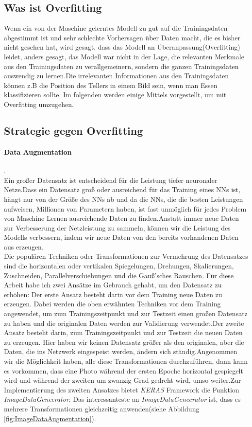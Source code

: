\documentclass[12pt,a4paper]{scrartcl}
\numberwithin{equation}{section}
\begin{document}
 \subsection{Was ist Overfitting}
 Wenn ein von der Maschine gelerntes Modell zu gut auf die Trainingsdaten abgestimmt ist und sehr schlechte Vorhersagen über Daten macht, die es bisher nicht gesehen hat, wird gesagt, dass das Modell an Überanpassung(Overfitting) leidet, anders gesagt, das Modell war nicht in der Lage, die relevanten Merkmale aus den Trainingsdaten zu verallgemeinern, sondern die ganzen Trainingsdaten auswendig zu lernen.Die irrelevanten Informationen aus den Trainingsdaten können z.B die Position des Tellers in einem Bild sein, wenn man Essen klassifizieren sollte. Im folgenden werden einige Mittels vorgestellt, um mit Overfitting umzugehen.
 \subsection{Strategie gegen Overfitting}
 \paragraph{Data Augmentation}.\\
 Ein großer Datensatz ist entscheidend für die Leistung tiefer neuronaler Netze.Dass ein Datensatz groß oder ausreichend für das Training eines \ac{NN}s ist, hängt nur von der Größe des \ac{NN}s ab und da die \acsp{NN}, die die besten Leistungen aufweisen, Millionen von Parametern haben, ist fast unmöglich für jedes  Problem von Maschine Lernen ausreichende Daten zu finden.Anstatt immer neue Daten zur Verbesserung der Netzleistung zu sammeln, können wir die Leistung des Modells verbessern, indem wir neue Daten von den bereits vorhandenen Daten aus erzeugen.\\
 Die populären Techniken oder Transformationen zur Vermehrung des Datensatzes sind die horizontalen oder vertikalen Spiegelungen, Drehungen, Skalierungen, Zuschneiden, Parallelverschiebungen und die Gauß'sches Rauschen.
 Für diese Arbeit habe ich zwei Ansätze im Gebrauch gehabt, um den Datensatz zu erhöhen:
 Der erste Ansatz besteht darin vor dem Training neue Daten zu erzeugen. Dabei werden die oben erwähnten Techniken vor dem Training angewendet, um zum Trainingszeitpunkt und zur Testzeit einen großen Datensatz zu haben und die originalen Daten werden zur Validierung verwendet.Der zweite Ansatz besteht darin, zum Trainingszeitpunkt und zur Testzeit die neuen Daten zu erzeugen. Hier haben wir keinen Datensatz größer als den originalen, aber die Daten, die ins Netzwerk eingespeist werden, ändern sich ständig.Angenommen wir die Möglichkeit haben, alle diese Transformationen durchzuführen, dann kann es vorkommen, dass eine Photo während der ersten Epoche horizontal gespiegelt wird und während der zweiten um  zwanzig Grad gedreht wird, umso weiter.Zur Implementierung des zweiten Ansatzes bietet \textit{KERAS} Framework die Funktion \textit{ImageDataGeneerator}. Das interessanteste an \textit{ImageDataGeneerator} ist, dass es mehrere Transformationen gleichzeitig anwenden(siehe Abbildung \ref{fig:ImageDataAugmentation}).
\end{document}

